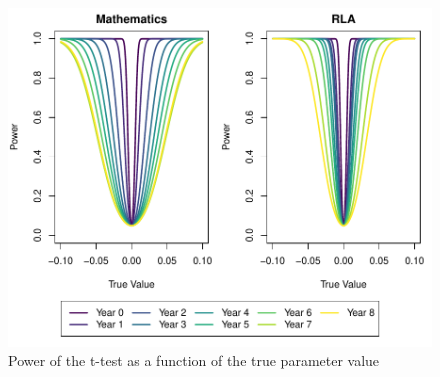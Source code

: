 \begin{figure}[!h]
	\centering
	\includegraphics[scale=1]{"../Code & Data/PowerAnalysis.pdf"}
	\caption{Power of the t-test as a function of the true parameter value}
	\label{Power}
\end{figure}




